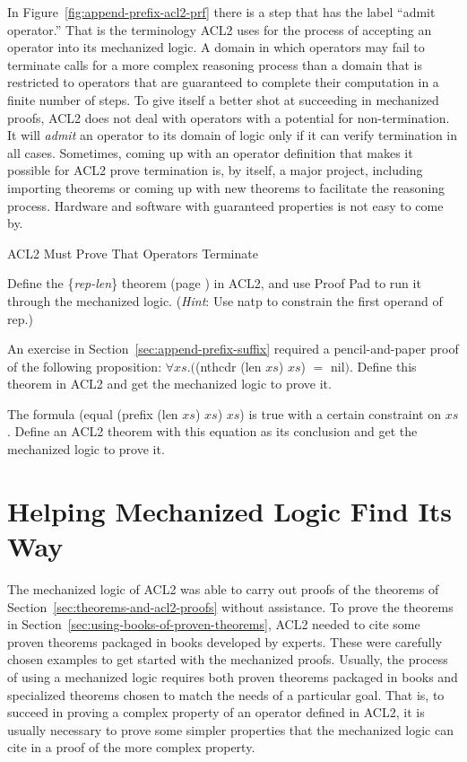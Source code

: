 \begin{aside}
In Figure~\ref{fig:append-prefix-acl2-prf}
there is a step that has the label ``admit operator.''
That is the terminology ACL2 uses for the process of accepting
an operator into its mechanized logic.
A domain in which operators may fail to terminate
calls for a more complex reasoning process than a domain that is
restricted to operators that are guaranteed to complete their
computation in a finite number of steps.
To give itself a better shot at succeeding in mechanized proofs,
ACL2 does not deal with operators with a potential for non-termination.
It will \emph{admit} an operator to its domain of logic
only if it can verify termination in all cases.
Sometimes, coming up with an operator definition that makes
it possible for ACL2 prove termination is, by itself,
a major project, including importing theorems or coming up with new
theorems to facilitate the reasoning process.
Hardware and software with guaranteed properties is not easy to come by.
\caption{ACL2 Must Prove That Operators Terminate}
\label{reason-for-acl2-admit}
\end{aside}

\begin{ExerciseList}

\Exercise Define the \{\emph{rep-len}\} theorem (page \pageref{rep-len}) in ACL2,
and use Proof Pad to run it through the mechanized logic.
(\emph{Hint}: Use \textsf{natp} to constrain the first operand of \textsf{rep}.)

\Exercise An exercise in Section~\ref{sec:append-prefix-suffix} required a pencil-and-paper
proof of the following proposition: $\forall xs.($\textsf{(nthcdr (len $xs$) $xs$)} $=$ \textsf{nil}$)$.
Define this theorem in ACL2 and get the mechanized logic to prove it.

\Exercise The formula \textsf{(equal (prefix (len $xs$) $xs$) $xs$)} is true with a certain
constraint on $xs$. Define an ACL2 theorem with this equation as its conclusion
and get the mechanized logic to prove it.

\end{ExerciseList}

\section{Helping Mechanized Logic Find Its Way}
\label{sec:lemmas}

The mechanized logic of ACL2 was able to carry out proofs of
the theorems of Section~\ref{sec:theorems-and-acl2-proofs} without assistance.
To prove the theorems in Section~\ref{sec:using-books-of-proven-theorems},
ACL2 needed to cite some proven theorems packaged in books
developed by experts.
These were carefully chosen examples to get started with
the mechanized proofs.
Usually, the process of using a mechanized logic requires
both proven theorems packaged in books
and specialized theorems chosen to match the
needs of a particular goal.
That is, to succeed in proving a complex property of
an operator defined in ACL2,
it is usually necessary to prove
some simpler properties that the mechanized
logic can cite in a proof of the more complex property.

